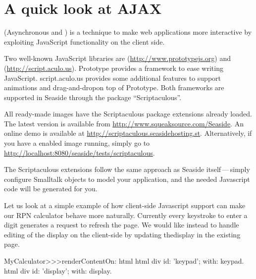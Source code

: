 \documentclass[a4paper,10pt,twoside]{book}
\begin{document}
\section{A quick look at AJAX}


 (Asynchronous  and ) is a technique to make web
applications more interactive by exploiting JavaScript functionality on the client side.

Two well-known JavaScript libraries are 
(\url{http://www.prototypejs.org}) and 
(\url{http://script.aculo.us}).
Prototype provides a framework to ease writing JavaScript.
script.aculo.us provides some additional features to support animations and drag-and-dropon top of Prototype.
Both frameworks are supported in Seaside through the package ``Scriptaculous''.

All ready-made images have the Scriptaculous package extensions already loaded.
The latest version is available from \url{http://www.squeaksource.com/Seaside}.
An online demo is available at \url{http://scriptaculous.seasidehosting.st}.
Alternatively, if you have a enabled image running, simply go to
\url{http://localhost:8080/seaside/tests/scriptaculous}.

The Scriptaculous extensions follow the same approach as Seaside itself\,---\,simply
configure Smalltalk objects to model your application, and the needed Javascript code
will be generated for you.

Let us look at a simple example of how client-side Javascript support can make our RPN
calculator behave more naturally.
Currently every keystroke to enter a digit generates a request to refresh the page.
We would like instead to handle editing of the display on the client-side by updating thedisplay in the existing page.


\begin{code}{}
MyCalculator>>>renderContentOn: html
	html div id: 'keypad'; with: keypad.
	html div id: 'display'; with: display.	
\end{code}
				
\end{document}
